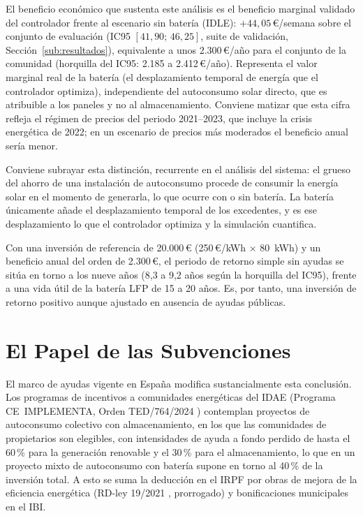 \documentclass[12pt, a4paper, twoside]{report}
\begin{document}
El beneficio económico que sustenta este análisis es el beneficio marginal
validado del controlador frente al escenario sin batería (IDLE):
$+44{,}05$\,€/semana sobre el conjunto de evaluación (IC95
$[41{,}90;\,46{,}25]$, suite de validación, Sección~\ref{sub:resultados}),
equivalente a unos 2.300\,€/año para el conjunto de la comunidad (horquilla
del IC95: 2.185 a 2.412\,€/año). Representa el valor marginal real de la
batería (el desplazamiento temporal de energía que el controlador optimiza),
independiente del autoconsumo solar directo, que es atribuible a los paneles y
no al almacenamiento. Conviene matizar que esta cifra refleja el régimen de
precios del periodo 2021--2023, que incluye la crisis energética de 2022; en
un escenario de precios más moderados el beneficio anual sería menor.

Conviene subrayar esta distinción, recurrente en el análisis del sistema: el
grueso del ahorro de una instalación de autoconsumo procede de consumir la
energía solar en el momento de generarla, lo que ocurre con o sin batería. La
batería únicamente añade el desplazamiento temporal de los excedentes, y es ese
desplazamiento lo que el controlador optimiza y la simulación cuantifica.

\begin{center}
\end{center}

Con una inversión de referencia de 20.000\,€ (250\,€/kWh
$\times$ \SI{80}{kWh}) y un beneficio anual del orden de 2.300\,€, el periodo
de retorno simple sin ayudas se sitúa en torno a los nueve años (8,3 a 9,2
años según la horquilla del IC95), frente a una vida útil de la batería LFP de
15 a 20 años. Es, por tanto, una inversión de retorno positivo aunque ajustado
en ausencia de ayudas públicas.

\section{El Papel de las Subvenciones}

El marco de ayudas vigente en España modifica sustancialmente esta conclusión.
Los programas de incentivos a comunidades energéticas del IDAE (Programa
CE~IMPLEMENTA, Orden TED/764/2024 \citep{TED764_2024}) contemplan proyectos de
autoconsumo colectivo con almacenamiento, en los que las comunidades de
propietarios son elegibles, con intensidades de ayuda a fondo perdido de hasta
el 60\,\% para la generación renovable y el 30\,\% para el almacenamiento, lo
que en un proyecto mixto de autoconsumo con batería supone en torno al
40\,\% de la inversión total. A esto se suma la
deducción en el IRPF por obras de mejora de la eficiencia energética
(RD-ley 19/2021 \citep{RDL19_2021}, prorrogado) y bonificaciones municipales
en el IBI.
\end{document}

